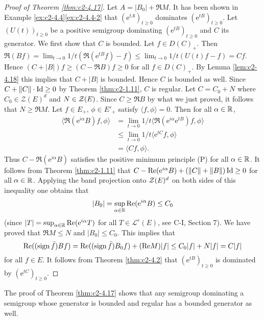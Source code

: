 \begin{proof}[Proof of Theorem \ref{thm:c2-4.17}]
Let $A = |B_{0}| + \Re M$. 
It has been shown in Example \ref{ex:c2-4.4}\ref{ex:c2-4.4-2} that $(\mathrm{e}^{tA})_{t \geq 0}$ dominates $(\mathrm{e}^{tB})_{t \geq 0}$.
Let $(U(t))_{t \geq 0}$ be a positive semigroup dominating $(\mathrm{e}^{tB})_{t \geq 0}$ and $C$ its generator.
We first show that $C$ is bounded.
Let $f \in D(C)_{+}$. Then $\Re(Bf) = \lim_{t \to 0} 1/t(\Re(\mathrm{e}^{tB}f) - f) \leq \lim_{t \to 0} 1/t(U(t)f - f) = Cf$.
Hence $(C + |B|)f \geq (C - \Re B)f \geq 0$ for all $f \in D(C)_{+}$.
By Lemma \ref{lem:c2-4.18} this implies that $C + |B|$ is bounded.
Hence $C$ is bounded as well.
Since $C + \|C\| \cdot \operatorname{Id} \geq 0$ by Theorem \ref{thm:c2-1.11}, $C$ is regular.
Let $C = C_{0} + N$ where $C_{0} \in \mathcal{Z}(E)^{d}$ and $N \in \mathcal{Z}(E)$.
Since $C \geq \Re B$ by what we just proved, it follows that $N \geq \Re M$.
Let $f \in E_{+}$, $\phi \in E'_{+}$ satisfy $\langle f,\phi \rangle = 0$.
Then for all $\alpha \in \mathbb{R}$,
\begin{align*}
\langle \Re(\mathrm{e}^{i\alpha}B)f,\phi \rangle &= \lim_{t \to 0}1/t \langle \Re(\mathrm{e}^{i\alpha}\mathrm{e}^{tB})f,\phi \rangle \\
&\leq \lim_{t \to 0}1/t \langle \mathrm{e}^{tC}f,\phi \rangle \\
&= \langle Cf,\phi \rangle.
\end{align*}
Thus $C - \Re(\mathrm{e}^{i\alpha}B)$ satisfies the positive minimum principle (P) 
for all $\alpha \in \mathbb{R}$.
It follows from Theorem \ref{thm:c2-1.11} that $C - \mathop{}\!\mathrm{Re}(\mathrm{e}^{i\alpha}B) + (\|C\|+\|B\|)\operatorname{Id} \geq 0$ for all $\alpha \in \mathbb{R}$.
Applying the band projection onto $\mathcal{Z}(E)^{d}$ on both sides of this inequality one obtains that
\[
|B_{0}| = \sup_{\alpha \in \mathbb{R}}\mathop{}\!\mathrm{Re}(\mathrm{e}^{i\alpha}B) \leq C_{0} 
\]
(since $|T| = \sup_{\alpha \in \mathbb{R}}\mathop{}\!\mathrm{Re}(\mathrm{e}^{i\alpha}T)$ for all $T \in \mathcal{L}^{r}(E)$, see C-I, Section 7).
We have proved that $\Re M \leq N$ and $|B_{0}| \leq C_{0}$.
This implies that
\[
\mathop{}\!\mathrm{Re}((\operatorname{sign}  \bar{f})Bf) = \mathop{}\!\mathrm{Re}((\operatorname{sign}  \bar{f})B_{0}f) + (\mathop{}\!\mathrm{Re} M)|f| \leq C_{0}|f| + N|f| = C|f|
\]
for all $f \in E$.
It follows from Theorem \ref{thm:c2-4.2}   that $(\mathrm{e}^{tB})_{t \geq 0}$ is dominated by $(\mathrm{e}^{tC})_{t \geq 0}$.
\end{proof}

\begin{remark*}
The proof of Theorem \ref{thm:c2-4.17}   shows that any semigroup dominating a semigroup whose generator is bounded and regular has a bounded generator as well.
\end{remark*}

